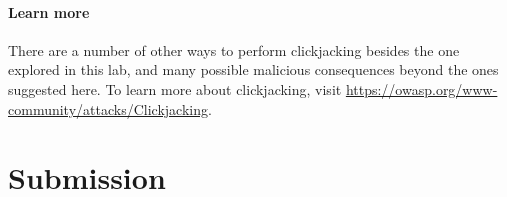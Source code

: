 \paragraph{Learn more}
There are a number of other ways to perform clickjacking besides the one
explored in this lab, and many possible malicious consequences beyond
the ones suggested here. To learn more about clickjacking, visit
\href{https://owasp.org/www-community/attacks/Clickjacking}{https://owasp.org/www-community/attacks/Clickjacking}.

\section{Submission}

\begin{quote}
\seedsubmission
\end{quote}



